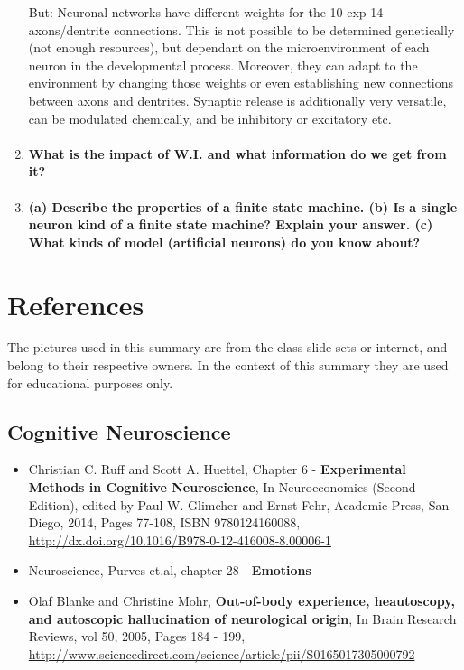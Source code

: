 \documentclass[12pt,article,oneside,a4paper]{memoir}
\begin{document}
\begin{enumerate}
	But: Neuronal networks have different weights for the 10 exp 14 axons/dentrite connections. This is not possible to be determined genetically (not enough resources), but dependant on the microenvironment of each neuron in the developmental process. Moreover, they can adapt to the environment by changing those weights or even establishing new connections between axons and dentrites.
	Synaptic release is additionally very versatile, can be modulated chemically, and be inhibitory or excitatory etc.

\item \paragraph{What is the impact of W.I. and what information do we get from it?}

\item \paragraph{ (a) Describe the properties of a finite state machine. (b) Is a single neuron kind of  a finite state machine? Explain your answer. (c) What kinds of model (artificial neurons) do you know about?}
\end{enumerate}




\newpage

\section{References}
The pictures used in this summary are from the class slide sets or internet, and belong to their respective owners. In the context of this summary they are used for educational purposes only.

\subsection{Cognitive Neuroscience}
\begin{itemize}
\item Christian C. Ruff and Scott A. Huettel, Chapter 6 - \textbf{Experimental Methods in Cognitive Neuroscience}, In Neuroeconomics (Second Edition), edited by Paul W. Glimcher and Ernst Fehr, Academic Press, San Diego, 2014, Pages 77-108, ISBN 9780124160088, \url{http://dx.doi.org/10.1016/B978-0-12-416008-8.00006-1}
\item Neuroscience, Purves et.al, chapter 28 - \textbf{Emotions}
\item Olaf Blanke and Christine Mohr, \textbf{Out-of-body experience, heautoscopy, and autoscopic hallucination of neurological origin}, In Brain Research Reviews, vol 50, 2005, Pages 184 - 199, \url{http://www.sciencedirect.com/science/article/pii/S0165017305000792}
\end{itemize}
\end{document}
